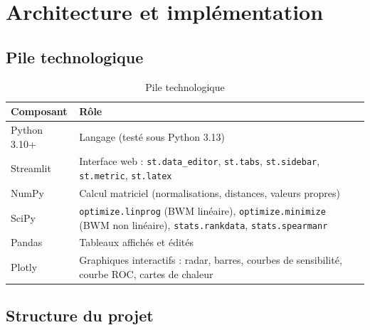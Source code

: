 \documentclass[11pt,a4paper]{report}
\theoremstyle{definition}
\theoremstyle{remark}
\begin{document}
\chapter{Architecture et implémentation}\label{ch:architecture}

\section{Pile technologique}

\begin{table}[H]
\centering
\caption{Pile technologique}\label{tab:stack}
\begin{tabularx}{\linewidth}{lX}
\toprule
\textbf{Composant} & \textbf{Rôle}\\
\midrule
Python 3.10+ & Langage (testé sous Python 3.13)\\
Streamlit & Interface web : \texttt{st.data\_editor}, \texttt{st.tabs}, \texttt{st.sidebar}, \texttt{st.metric}, \texttt{st.latex}\\
NumPy & Calcul matriciel (normalisations, distances, valeurs propres)\\
SciPy & \texttt{optimize.linprog} (BWM linéaire), \texttt{optimize.minimize} (BWM non linéaire), \texttt{stats.rankdata}, \texttt{stats.spearmanr}\\
Pandas & Tableaux affichés et édités\\
Plotly & Graphiques interactifs : radar, barres, courbes de sensibilité, courbe ROC, cartes de chaleur\\
\bottomrule
\end{tabularx}
\end{table}

\section{Structure du projet}
\end{document}
